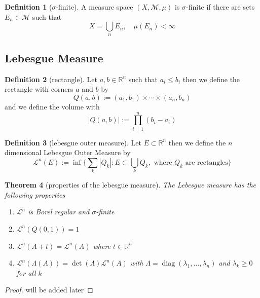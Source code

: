 \documentclass[11pt,a4paper]{article}
\newcommand{\bR}{\mathbb{R}}
\newcommand{\cM}{\mathcal{M}}
\newcommand{\cL}{\mathcal{L}}
\theoremstyle{plain}
\newtheorem{theorem}{Theorem}[section]
\theoremstyle{definition}
\newtheorem{definition}[theorem]{Definition}
\begin{document}
\begin{definition}[$\sigma$-finite]
    A measure space $(X, \cM, \mu)$ is $\sigma$-finite if there are sets $E_n \in \cM$ such that 
    \[
        X = \bigcup_n E_n, \quad \mu(E_n) < \infty
    \]
\end{definition}

\subsection{Lebesgue Measure}
\begin{definition}[rectangle]
    Let $a, b \in \bR^n$ such that $a_i \le b_i$ then we define the rectangle with corners $a$ and $b$ by
    \[
        Q(a, b) := (a_1, b_1) \times \cdots \times (a_n, b_n)
    \]
    and we define the volume with 
    \[
        |Q(a, b)| := \prod_{i=1}^n (b_i - a_i)
    \]
\end{definition}


\begin{definition}[lebesgue outer measure]
    Let $E \subset \bR^n$ then we define the $n$ dimensional Lebesgue Outer Measure by 
    \[
        \cL^n(E) := \inf \{ \sum_k |Q_k|: E \subset \bigcup_k Q_k, \text{ where } Q_k \text{ are rectangles} \}
    \]
\end{definition}

\begin{theorem}[properties of the lebesgue measure]
    The Lebesgue measure has the following properties
    \begin{enumerate}
        \item $\cL^n$ is Borel regular and $\sigma$-finite
        \item $\cL^n(Q(0, 1)) = 1$
        \item $\cL^n(A + t) = \cL^n(A)$ where $t \in \bR^n$
        \item $\cL^n(\Lambda(A)) = \det (\Lambda) \cL^n(A)$ 
            with $\Lambda = \operatorname{diag}(\lambda_1, \dots, \lambda_n)$ and $\lambda_k \ge 0$ for all $k$
    \end{enumerate}
\end{theorem}
\begin{proof}
    will be added later
\end{proof}

\newpage
\end{document}
